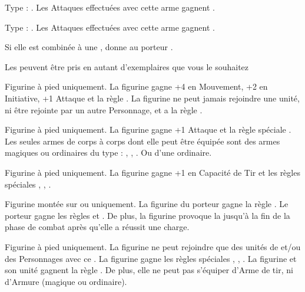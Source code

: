 \listitemonecol{\sylvanlance} Type : \lightlance. Les Attaques effectuées avec cette arme gagnent .

\listitemonecol{\sylvanblades} Type : \pw. Les Attaques effectuées avec cette arme gagnent .

\listitemonecol{\elvencloak} Si elle est combinée à une \la{}, donne au porteur .

\enditemlistonecol

\closearmyarmoury

\begin{multicols}{2}
\startarmynewsection{\kindreds}

\spaceaftersection{}

Les \kindreds{} peuvent être pris en autant d'exemplaires que vous le souhaitez

\startpricelistNSP

Figurine à pied uniquement. La figurine gagne +4 en Mouvement, +2 en Initiative, +1 Attaque et la règle . La figurine ne peut jamais rejoindre une unité, ni être rejointe par un autre Personnage, et a la règle \notaleader{}.

Figurine à pied uniquement. La figurine gagne +1 Attaque et la règle spéciale . Les seules armes de corps à corps dont elle peut être équipée sont des armes magiques ou ordinaires du type : \spear{}, \greatweapon{}, \sylvanblades{}. Ou d'une \hw{} ordinaire.

Figurine à pied uniquement. La figurine gagne +1 en Capacité de Tir et les règles spéciales \scout{}, \masterarchers{}, .

Figurine montée sur \elvenhorse{} ou \greatelk{} uniquement. La figurine du porteur gagne la règle \frenzy{}. Le porteur gagne les règles \devastatingcharge{} et \lighttroops{}. De plus, la figurine provoque la \fear{} jusqu'à la fin de la phase de combat après qu'elle a réussit une charge.

Figurine à pied uniquement. La figurine ne peut rejoindre que des unités de \bladedancers{} et/ou des Personnages avec ce \kindreds{}. La figurine gagne les règles spéciales \dancesofcenyrn{}, \immunetopsychology{}, . La figurine et son unité gagnent la règle \swiftstride{}. De plus, elle ne peut pas s'équiper d'Arme de tir, ni d'Armure (magique ou ordinaire).


\end{multicols}
